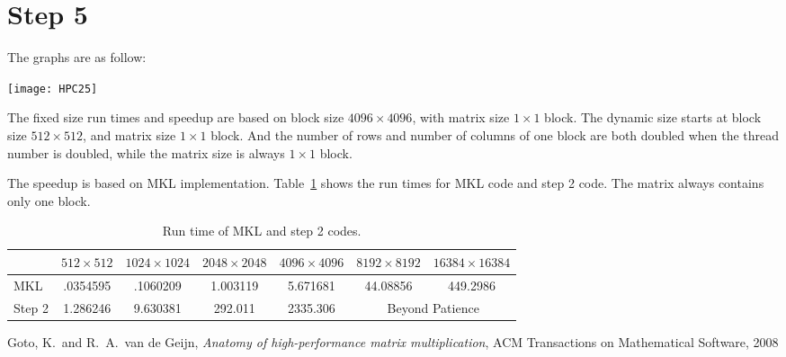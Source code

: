 \documentclass[12pt]{article}
\newcommand{\0}{\mathbf{0}}
\begin{document}
	\renewcommand{\arraystretch}{1.5}

	\section{Step 5}
	The graphs are as follow:

	\texttt{[image: HPC25]}
	
	The fixed size run times and speedup are based on block size $4096\times4096$, with matrix size $1\times1$ block. The dynamic size starts at block size $512\times512$, and matrix size $1\times1$ block. And the number of rows and number of columns of one block are both doubled when the thread number is doubled, while the matrix size is always $1\times1$ block.
	
	The speedup is based on MKL implementation. Table~\ref{tab:rt} shows the run times for MKL code and step 2 code. The matrix always contains only one block.
	\begin{table}
	  \centering
	  \begin{tabular}{|l|c|c|c|c|c|c|}
	    \hline
	    & $512\times512$ & $1024\times1024$ & $2048\times2048$
	    & $4096\times4096$ & $8192\times8192$ & $16384\times16384$\\
	    \hline
	    MKL & .0354595 & .1060209 & 1.003119 & 5.671681 & 44.08856 & 449.2986\\

	    Step 2 & 1.286246 & 9.630381 & 292.011 & 2335.306 & \multicolumn{2}{c|}{Beyond Patience}\\
	    \hline
	  \end{tabular}
	  \caption{Run time of MKL and step 2 codes.}
	  \label{tab:rt}
	\end{table}

	\begin{thebibliography}{9}
	    Goto, K.~and R.~A.~van de Geijn,
	    \emph{Anatomy of high-performance matrix multiplication},
	    ACM Transactions on Mathematical Software,
	    2008
	\end{thebibliography}
\end{document}
